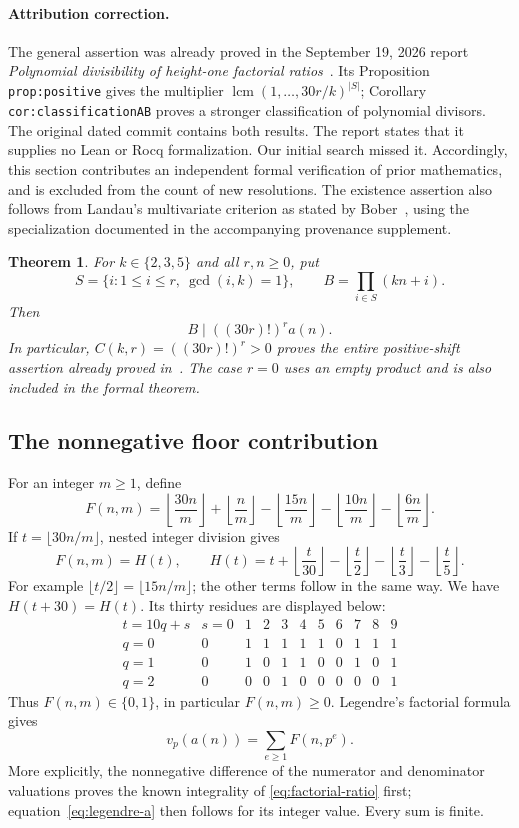 \documentclass[11pt]{article}
\newtheorem{theorem}{Theorem}[section]
\begin{document}
\paragraph{Attribution correction.}
The general assertion was already proved in the September 19, 2026
report \emph{Polynomial divisibility of height-one factorial
ratios}~\cite{PriorFactorial}. Its Proposition \texttt{prop:positive}
gives the multiplier $\operatorname{lcm}(1,\ldots,30r/k)^{|S|}$;
Corollary \texttt{cor:classificationAB} proves a stronger
classification of polynomial divisors. The original dated commit
contains both results. The report states that it supplies no Lean
or Rocq formalization. Our initial search missed it. Accordingly,
this section contributes an independent formal verification of prior
mathematics, and is excluded from the count of new resolutions.
The existence assertion also follows from Landau's multivariate
criterion as stated by Bober~\cite{Bober}, using the specialization
documented in the accompanying provenance supplement.

\begin{theorem}\label{thm:factorial}
For $k\in\{2,3,5\}$ and all $r,n\ge0$, put
\[
S=\{i:1\le i\le r,\ \gcd(i,k)=1\},\qquad
B=\prod_{i\in S}(kn+i).
\]
Then
\[
\boxed{B\mid ((30r)!)^r a(n).}
\]
In particular, $C(k,r)=((30r)!)^r>0$ proves the entire
positive-shift assertion already proved in~\cite{PriorFactorial}.
The case $r=0$ uses an empty
product and is also included in the formal theorem.
\end{theorem}

\subsection{The nonnegative floor contribution}

For an integer $m\ge1$, define
\[
F(n,m)=\left\lfloor\frac{30n}{m}\right\rfloor
+\left\lfloor\frac n m\right\rfloor
-\left\lfloor\frac{15n}{m}\right\rfloor
-\left\lfloor\frac{10n}{m}\right\rfloor
-\left\lfloor\frac{6n}{m}\right\rfloor.
\]
If $t=\lfloor30n/m\rfloor$, nested integer division gives
\[
F(n,m)=H(t),\qquad
H(t)=t+\left\lfloor\frac t{30}\right\rfloor
-\left\lfloor\frac t2\right\rfloor
-\left\lfloor\frac t3\right\rfloor
-\left\lfloor\frac t5\right\rfloor.
\]
For example $\lfloor t/2\rfloor=\lfloor15n/m\rfloor$;
the other terms follow in the same way. We have
$H(t+30)=H(t)$. Its thirty residues are displayed below:
\[
\begin{array}{c|rrrrrrrrrr}
t=10q+s&s=0&1&2&3&4&5&6&7&8&9\\\hline
q=0&0&1&1&1&1&1&0&1&1&1\\
q=1&0&1&0&1&1&0&0&1&0&1\\
q=2&0&0&0&1&0&0&0&0&0&1
\end{array}
\]
Thus $F(n,m)\in\{0,1\}$, in particular $F(n,m)\ge0$.
Legendre's factorial formula gives
\begin{equation}\label{eq:legendre-a}
v_p(a(n))=\sum_{e\ge1}F(n,p^e).
\end{equation}
More explicitly, the nonnegative difference of the numerator and
denominator valuations proves the known integrality of
\eqref{eq:factorial-ratio} first; equation~\eqref{eq:legendre-a}
then follows for its integer value. Every sum is finite.
\end{document}
